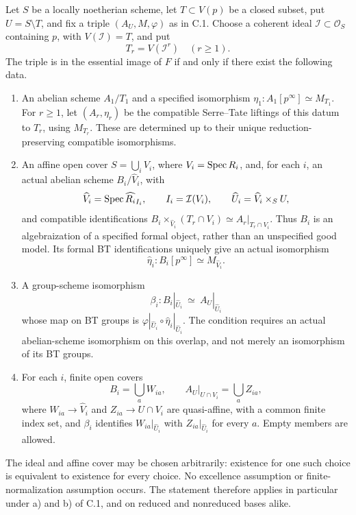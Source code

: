 \begin{theorem}
\label{thm:C-RD13}
Let $S$ be a locally noetherian scheme, let $T\subset V(p)$ be a closed subset,
put $U=S\setminus T$, and fix a triple $(A_U,M,\varphi)$ as in C.1.
Choose a coherent ideal $\mathcal I\subset\mathcal O_S$ containing
$p$, with $V(\mathcal I)=T$, and put
\[
 T_r=V(\mathcal I^r)\quad(r\geq1).
\]
The triple is in the essential image of $F$ if and only if there
exist the following data.

\begin{enumerate}
\item An abelian scheme $A_1/T_1$ and a specified isomorphism
$\eta_1:A_1[p^\infty]\simeq M_{T_1}$.
For $r\geq1$, let $(A_r,\eta_r)$ be the compatible Serre--Tate
liftings of this datum to $T_r$, using $M_{T_r}$. These are determined
up to their unique reduction-preserving compatible isomorphisms.

\item An affine open cover $S=\bigcup_i V_i$, where
$V_i=\operatorname{Spec} R_i$, and, for each $i$, an actual abelian scheme
$B_i/\widehat V_i$, with
\[
 \widehat V_i=\operatorname{Spec}\widehat{R_i}_{I_i},\qquad
 I_i=\mathcal I(V_i),\qquad
 \widehat U_i=\widehat V_i\times_SU,
\]
and compatible identifications
$B_i\times_{\widehat V_i}(T_r\cap V_i)\simeq A_r|_{T_r\cap V_i}$.
Thus $B_i$ is an algebraization of a specified formal object, rather
than an unspecified good model. Its formal BT identifications
uniquely give an actual isomorphism
\[
 \widehat\eta_i:B_i[p^\infty]\simeq M_{\widehat V_i}.
                                                        \tag{C-RD13.1}
\]

\item A group-scheme isomorphism
\[
 \beta_i:B_i|_{\widehat U_i}\ \simeq\ A_U|_{\widehat U_i}
                                                        \tag{C-RD13.2}
\]
whose map on BT groups is
$\varphi|_{\widehat U_i}\circ\widehat\eta_i|_{\widehat U_i}$.
The condition requires an actual abelian-scheme isomorphism on this
overlap, and not merely an isomorphism of its BT groups.

\item For each $i$, finite open covers
\[
 B_i=\bigcup_a W_{ia},\qquad
 A_U|_{U\cap V_i}=\bigcup_a Z_{ia},
                                                        \tag{C-RD13.3}
\]
where $W_{ia}\to\widehat V_i$ and $Z_{ia}\to U\cap V_i$ are
quasi-affine, with a common finite index set, and $\beta_i$ identifies
$W_{ia}|_{\widehat U_i}$ with $Z_{ia}|_{\widehat U_i}$ for every $a$.
Empty members are allowed.
\end{enumerate}
The ideal and affine cover may be chosen arbitrarily: existence for
one such choice is equivalent to existence for every choice. No
excellence assumption or finite-normalization assumption occurs.
The statement therefore applies in particular under a) and b) of C.1,
and on reduced and nonreduced bases alike.
\end{theorem}
